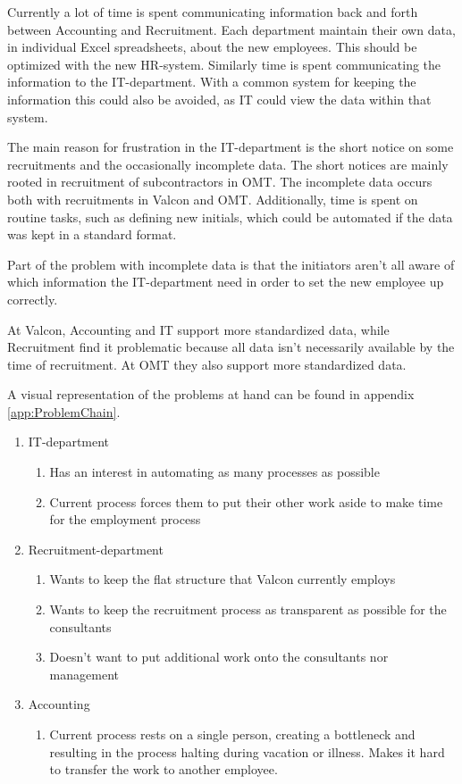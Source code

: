 Currently a lot of time is spent communicating information back and forth between Accounting and Recruitment. 
Each department maintain their own data, in individual Excel spreadsheets, about the new employees. 
This should be optimized with the new HR-system.
Similarly time is spent communicating the information to the IT-department.
With a common system for keeping the information this could also be avoided, as IT could view the data within that system.

The main reason for frustration in the IT-department is the short notice on some recruitments and the occasionally incomplete data.
The short notices are mainly rooted in recruitment of subcontractors in OMT.
The incomplete data occurs both with recruitments in Valcon and OMT.
Additionally, time is spent on routine tasks, such as defining new initials, which could be automated if the data was kept in a standard format.

Part of the problem with incomplete data is that the initiators aren't all aware of which information the IT-department need in order to set the new employee up correctly.

At Valcon, Accounting and IT support more standardized data, while Recruitment find it problematic because all data isn't necessarily available by the time of recruitment.
At OMT they also support more standardized data.

A visual representation of the problems at hand can be found in appendix \ref{app:ProblemChain}.

\begin{enumerate}
	\item IT-department
	\begin{enumerate}
		\item Has an interest in automating as many processes as possible
		\item Current process forces them to put their other work aside to make time for the employment process
	\end{enumerate}
	\item Recruitment-department
	\begin{enumerate}
		\item Wants to keep the flat structure that Valcon currently employs
		\item Wants to keep the recruitment process as transparent as possible for the consultants
		\item Doesn't want to put additional work onto the consultants nor management
	\end{enumerate}
	\item Accounting
	\begin{enumerate}
		\item Current process rests on a single person, creating a bottleneck and resulting in the process halting during vacation or illness. Makes it hard to transfer the work to another employee.
	\end{enumerate}
	
\end{enumerate}